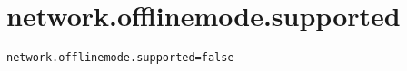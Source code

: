 \section{network.offlinemode.supported}
\label{configuration:NetworkOfflinemodeSupported}
\ClearAPI
\TODO
{}
\begin{lstlisting}[style=Props,caption={Usage example for \textit{network.offlinemode.supported}}]
network.offlinemode.supported=false
\end{lstlisting}